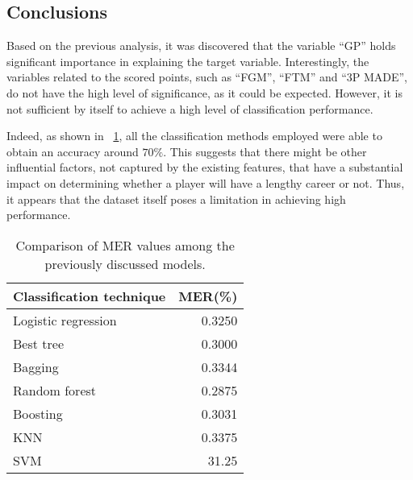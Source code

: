 \subsection{Conclusions}

Based on the previous analysis, it was discovered that the variable ``GP'' holds significant importance in explaining the target variable. Interestingly, the variables related to the scored points, such as ``FGM'', ``FTM'' and ``3P MADE'', do not have the high level of significance, as it could be expected. 
However, it is not sufficient by itself to achieve a high level of classification performance.

Indeed, as shown in \Tab~\ref{table:ClasEvalParams}, all the classification methods employed were able to obtain an accuracy around $70\%$. This suggests that there might be other influential factors, not captured by the existing features, that have a substantial impact on determining whether a player will have a lengthy career or not. Thus, it appears that the dataset itself poses a limitation in achieving high performance.

\begin{table}[h]
	\centering
	\begin{tabular}{|| l | r ||} 
		\hline
		Classification technique & MER(\%) \\
		\hline
		\hline
		Logistic regression & 0.3250 \\
		\hline
		Best tree & 0.3000 \\
		\hline
		Bagging & 0.3344 \\
		\hline
		Random forest & 0.2875 \\
		\hline
		Boosting & 0.3031 \\
		\hline
		KNN & 0.3375 \\
		\hline
		SVM & 31.25 \\
		\hline
	\end{tabular}
	\caption{Comparison of MER values among the previously discussed models.}
	\label{table:ClasEvalParams}
\end{table}

